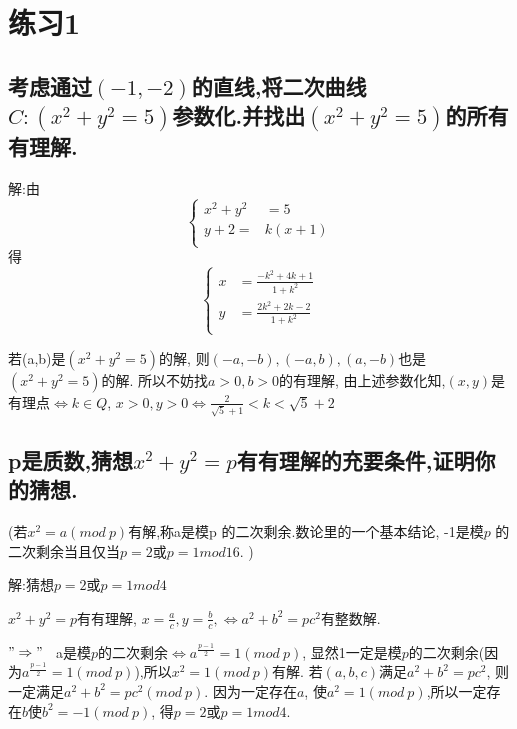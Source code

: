 \documentclass[UTF8]{book}
\begin{document}
	\section*{练习1}
		\subsection{考虑通过$ (-1,-2) $的直线,将二次曲线$C:(x^{2}+y^{2}=5)$参数化.并找出$(x^{2}+y^{2}=5)$的所有有理解.}
			解:由
				\begin{equation*}
				  \left\{
				   \begin{aligned}
				 x^{2}+y^{2} &=5 \\
				 y+2= &k(x+1)\\
				   \end{aligned}
				   \right.
				\end{equation*}
			得
				\begin{equation*}
				  \left\{
				   \begin{aligned}
				  x &=\frac{-k^{2}+4k+1}{1+k^{2}} \\
				  y &=\frac{2k^{2}+2k-2}{1+k^{2}}\\
				   \end{aligned}
				   \right.
				\end{equation*}
			
			
			若(a,b)是$(x^{2}+y^{2}=5)$的解, 则$ (-a,-b),(-a,b),(a,-b) $也是$(x^{2}+y^{2}=5)$的解. 所以不妨找$a>0, b>0$的有理解, 由上述参数化知,$ (x,y) $是有理点$\Leftrightarrow k\in Q$, $x>0, y>0\Leftrightarrow \frac{2}{\sqrt{5}+1}<k<\sqrt{5}+2$
			
		\subsection{p是质数,猜想$x^{2}+y^{2}=p$有有理解的充要条件,证明你的猜想. }
			(若$x^{2}=a(mod \ p)$有解,称a是模p 的二次剩余.数论里的一个基本结论, -1是模$ p $ 的二次剩余当且仅当$ p=2 $或$ p=1mod16 $. )
			
			解:猜想$ p=2 $或$ p=1mod 4 $
			
			
			 $x^{2}+y^{2}=p$有有理解, $x=\frac{a}{c},y=\frac{b}{c},\Leftrightarrow a^{2}+b^{2}=pc^{2}$有整数解.
			
			$"\Rightarrow"$ \ a是模$ p $的二次剩余$\Leftrightarrow a^{\frac{p-1}{2}}=1(mod \ p)$, 显然1一定是模$ p $的二次剩余(因为$a^{\frac{p-1}{2}}=1(mod \ p)$),所以$x^{2}=1(mod \ p)$有解. 若$ (a,b,c) $满足$a^{2}+b^{2}=pc^{2}$, 则一定满足$a^{2}+b^{2}=pc^{2}(mod \ p)$. 因为一定存在$ a $, 使$a^{2}=1(mod \ p)$,所以一定存在$ b $使$b^{2}=-1(mod \ p)$, 得$ p=2 $或$ p=1mod4 $.
			
\end{document}
